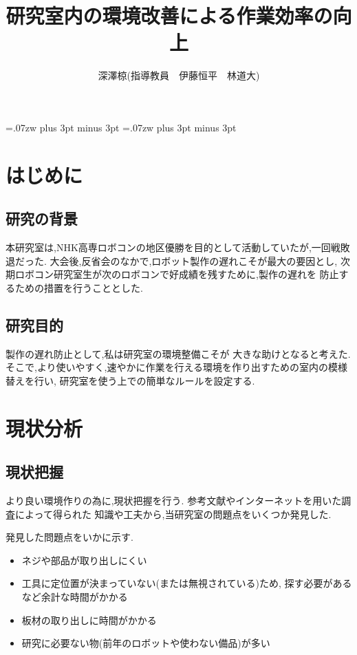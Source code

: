 \documentclass[twocolumn,11pt]{abst}
\title{研究室内の環境改善による作業効率の向上}
\author{深澤椋(指導教員　伊藤恒平　林道大)}
\begin{document}
\maketitle
\thispagestyle{fancy}
\pagestyle{fancy}

\setlength{\baselineskip}{5.6truemm}
\kanjiskip=.07zw plus 3pt minus 3pt
\xkanjiskip=.07zw plus 3pt minus 3pt


\section{はじめに}
\subsection{研究の背景}
本研究室は,NHK高専ロボコンの地区優勝を目的として活動していたが,一回戦敗退だった.
大会後,反省会のなかで,ロボット製作の遅れこそが最大の要因とし,
次期ロボコン研究室生が次のロボコンで好成績を残すために,製作の遅れを
防止するための措置を行うこととした.

\subsection{研究目的}
製作の遅れ防止として,私は研究室の環境整備こそが
大きな助けとなると考えた.
そこで,より使いやすく,速やかに作業を行える環境を作り出すための室内の模様替えを行い,
研究室を使う上での簡単なルールを設定する.


\section{現状分析}
\subsection{現状把握}
より良い環境作りの為に,現状把握を行う.
参考文献\cite{toyota}やインターネットを用いた調査によって得られた
知識や工夫から,当研究室の問題点をいくつか発見した.
\par 発見した問題点をいかに示す.

\begin{itemize}
\item ネジや部品が取り出しにくい
\item 工具に定位置が決まっていない(または無視されている)ため,
探す必要があるなど余計な時間がかかる
\item 板材の取り出しに時間がかかる
\item 研究に必要ない物(前年のロボットや使わない備品)が多い
\end{itemize}
\end{document}
